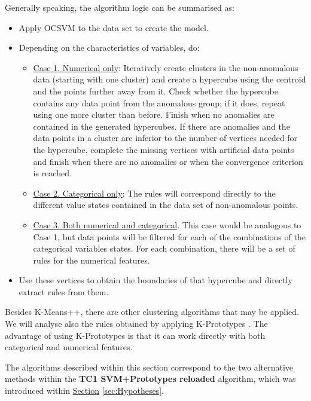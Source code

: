 Generally speaking, the algorithm logic can be summarised as:
\begin{itemize}
    \item Apply OCSVM to the data set to create the model.
    \item Depending on the characteristics of variables, do:
    \begin{itemize}
    \item \underline{Case 1. Numerical only}:  Iteratively create clusters in the non-anomalous data (starting with one cluster) and create a hypercube using the centroid and the points further away from it. Check whether the hypercube contains any data point from the anomalous group; if it does, repeat using one more cluster than before. Finish when no anomalies are contained in the generated hypercubes. If there are anomalies and the data points in a cluster are inferior to the number of vertices needed for the hypercube, complete the missing vertices with artificial data points and finish when there are no anomalies or when the convergence criterion is reached.
    \item \underline{Case 2. Categorical only}: The rules will correspond directly to the different value states contained in the data set of non-anomalous points.
    \item \underline{Case 3. Both numerical and categorical}. This case would be analogous to Case 1, but data points will be filtered for each of the combinations of the categorical variables states. For each combination, there will be a set of rules for the numerical features.
    \end{itemize}
    \item Use these vertices to obtain the boundaries of that hypercube and directly extract rules from them.
\end{itemize}

Besides K-Means++, there are other clustering algorithms that may be applied. We will analyse also the rules obtained by applying K-Prototypes \parencite{ji2013improved}. The advantage of using K-Prototypes is that it can work directly with both categorical and numerical features.

The algorithms described within this section correspond to the two alternative methods within the \textbf{TC1 SVM+Prototypes reloaded} algorithm, which was introduced within \hyperref[sec:Hypotheses]{Section} \ref{sec:Hypotheses}.

